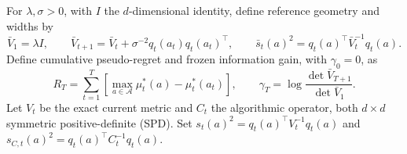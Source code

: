 \documentclass[10pt]{article}
\theoremstyle{definition}
\newcommand{\Vbar}{\bar V}
\begin{document}
For $\lambda,\sigma>0$, with $I$ the $d$-dimensional identity, define reference geometry and widths by
\begin{equation}
\Vbar_1=\lambda I,\qquad
\Vbar_{t+1}=\Vbar_t+\sigma^{-2}q_t(a_t)q_t(a_t)^\top,
\qquad
\bar s_t(a)^2=q_t(a)^\top\Vbar_t^{-1}q_t(a).
\label{eq:reference}
\end{equation}
Define cumulative pseudo-regret and frozen information gain, with $\gamma_0=0$, as
\begin{equation}
R_T=\sum_{t=1}^T\left[\max_{a\in\mathcal A}\mu_t^*(a)-\mu_t^*(a_t)\right],\qquad
\gamma_T=\log\frac{\det\Vbar_{T+1}}{\det\Vbar_1}.
\label{eq:regret-gain}
\end{equation}
Let $V_t$ be the exact current metric and $C_t$ the algorithmic operator, both $d\times d$ symmetric positive-definite (SPD). Set $s_t(a)^2=q_t(a)^\top V_t^{-1}q_t(a)$ and $s_{C,t}(a)^2=q_t(a)^\top C_t^{-1}q_t(a)$.
\end{document}
